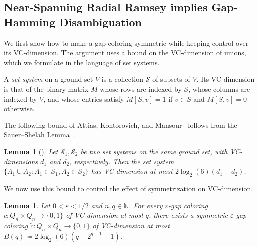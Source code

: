 \documentclass[11pt]{article}
\newtheorem{lemma}[theorem]{Lemma}
\theoremstyle{remark}
\begin{document}
\subsection{Near-Spanning Radial Ramsey implies Gap-Hamming Disambiguation}

We first show how to make a gap coloring symmetric while keeping control over its VC-dimension.
The argument uses a bound on the VC-dimension of unions, which we formulate in the language of set systems.

A \emph{set system} on a ground set $V$ is a collection $\mathcal S$ of subsets of $V$.
Its VC-dimension is that of the binary matrix $M$ whose rows are indexed by $\mathcal S$, whose columns are indexed by $V$, and whose entries satisfy $M[S,v]=1$ if $v\in S$ and $M[S,v]=0$ otherwise.

The following bound of Attias, Kontorovich, and Mansour~\cite{AKM22} follows from the Sauer--Shelah Lemma~\cite{Sauer72,Shelah72}.

\begin{lemma}[{\cite[Lemma 16]{AKM22}}] \label{lem:vcdim-union}
    Let $\mathcal{S}_1, \mathcal{S}_2$ be two set systems on the same ground set, with VC-dimensions $d_1$ and $d_2$, respectively.
    Then the set system $\{A_1 \cup A_2 : A_1 \in \mathcal{S}_1, A_2 \in \mathcal{S}_2\}$ has VC-dimension at most $2\log_2(6)(d_1+d_2)$.
\end{lemma}

We now use this bound to control the effect of symmetrization on VC-dimension.

\begin{lemma}\label{lem:make-c-symmetric}
    Let $0 < \varepsilon < 1/2$ and $n, q \in \mathbb{N}$.
    For every $\varepsilon$-gap coloring $c: Q_n \times Q_n \to \{0, 1\}$ of VC-dimension at most $q$, there exists a symmetric $\varepsilon$-gap coloring $\widetilde{c} : Q_n \times Q_n \to \{0, 1\}$ of VC-dimension at most $B(q) \coloneqq 2\log_2(6)(q+2^{q+1}-1)$.
\end{lemma}
\end{document}
